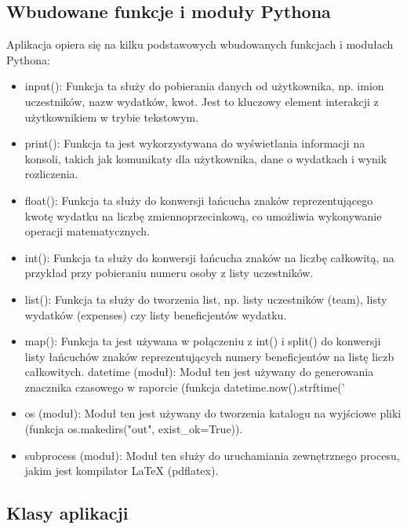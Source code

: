 \documentclass{article}
\begin{document}
\subsection{Wbudowane funkcje i moduły Pythona}

Aplikacja opiera się na kilku podstawowych wbudowanych funkcjach i modułach Pythona:
\begin{itemize}
\item input(): Funkcja ta służy do pobierania danych od użytkownika, np. imion uczestników, nazw wydatków, kwot. Jest to kluczowy element interakcji z użytkownikiem w trybie tekstowym.
\item print(): Funkcja ta jest wykorzystywana do wyświetlania informacji na konsoli, takich jak komunikaty dla użytkownika, dane o wydatkach i wynik rozliczenia.
\item float(): Funkcja ta służy do konwersji łańcucha znaków reprezentującego kwotę wydatku na liczbę zmiennoprzecinkową, co umożliwia wykonywanie operacji matematycznych.
\item int(): Funkcja ta służy do konwersji łańcucha znaków na liczbę całkowitą, na przykład przy pobieraniu numeru osoby z listy uczestników.
\item list(): Funkcja ta służy do tworzenia list, np. listy uczestników (team), listy wydatków (expenses) czy listy beneficjentów wydatku.
\item map(): Funkcja ta jest używana w połączeniu z int() i split() do konwersji listy łańcuchów znaków reprezentujących numery beneficjentów na listę liczb całkowitych.
datetime (moduł): Moduł ten jest używany do generowania znacznika czasowego w raporcie (funkcja datetime.now().strftime('%
\item os (moduł): Moduł ten jest używany do tworzenia katalogu na wyjściowe pliki (funkcja os.makedirs("out", exist\_ok=True)).
\item subprocess (moduł): Moduł ten służy do uruchamiania zewnętrznego procesu, jakim jest kompilator LaTeX (pdflatex).
\end{itemize}
\subsection{Klasy aplikacji}
\end{document}
